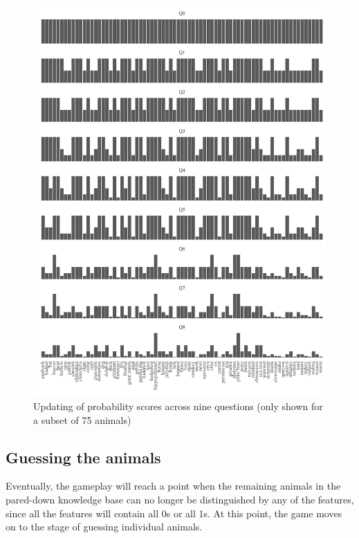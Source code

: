 \documentclass[11pt,a4paper]{article}
\begin{document}
\begin{figure}
	\includegraphics[width=\linewidth]{graphics/updating.pdf}
	\caption{Updating of probability scores across nine questions (only shown for a subset of 75 animals)}
	\label{fig:bayesian-update}
\end{figure}

\subsection{Guessing the animals}
\label{subsec:guess-animals}

Eventually, the gameplay will reach a point when the remaining animals in the pared-down knowledge base can no longer be distinguished by any of the features, since all the features will contain all 0s or all 1s.
At this point, the game moves on to the stage of guessing individual animals.
\end{document}
